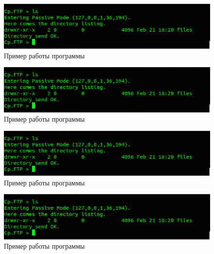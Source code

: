 \begin{figure}[H]
	\centering
	\includegraphics[width=0.7\linewidth]{src/img/7}
	\caption{Пример работы программы}
	\label{fig:7}
\end{figure}

\begin{figure}[H]
	\centering
	\includegraphics[width=0.7\linewidth]{src/img/7}
	\caption{Пример работы программы}
	\label{fig:8}
\end{figure}

\begin{figure}[H]
	\centering
	\includegraphics[width=0.7\linewidth]{src/img/7}
	\caption{Пример работы программы}
	\label{fig:9}
\end{figure}

\begin{figure}[H]
	\centering
	\includegraphics[width=0.7\linewidth]{src/img/7}
	\caption{Пример работы программы}
	\label{fig:10}
\end{figure}


